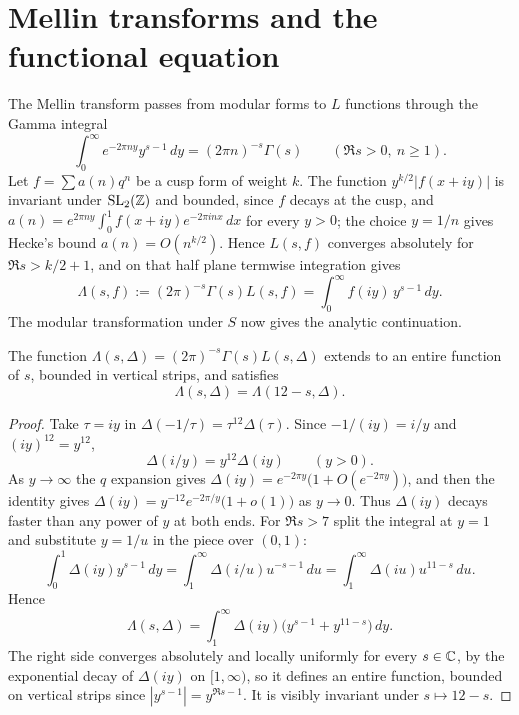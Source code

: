 \section{Mellin transforms and the functional equation}\label{sec:02mellin}

The Mellin transform passes from modular forms to $L$ functions through the Gamma integral
\[
\int_0^\infty e^{-2\pi ny}y^{s-1}\,dy=(2\pi n)^{-s}\Gamma(s)\qquad(\Re s>0,\ n\ge1).
\]
Let $f=\sum a(n)q^n$ be a cusp form of weight $k$. The function $y^{k/2}|f(x+iy)|$ is invariant under $\mathrm{SL}_2(\mathbb{Z})$ and bounded, since $f$ decays at the cusp, and $a(n)=e^{2\pi ny}\int_0^1f(x+iy)e^{-2\pi inx}\,dx$ for every $y>0$; the choice $y=1/n$ gives Hecke's bound $a(n)=O(n^{k/2})$. Hence $L(s,f)$ converges absolutely for $\Re s>k/2+1$, and on that half plane termwise integration gives
\[
\Lambda(s,f):=(2\pi)^{-s}\Gamma(s)L(s,f)=\int_0^\infty f(iy)\,y^{s-1}\,dy.
\]
The modular transformation under $S$ now gives the analytic continuation.

\begin{theorem}\label{thm:02fe}
The function $\Lambda(s,\Delta)=(2\pi)^{-s}\Gamma(s)L(s,\Delta)$ extends to an entire function of $s$, bounded in vertical strips, and satisfies
\[
\Lambda(s,\Delta)=\Lambda(12-s,\Delta).
\]
\end{theorem}

\begin{proof}
Take $\tau=iy$ in $\Delta(-1/\tau)=\tau^{12}\Delta(\tau)$. Since $-1/(iy)=i/y$ and $(iy)^{12}=y^{12}$,
\[
\Delta(i/y)=y^{12}\Delta(iy)\qquad(y>0).
\]
As $y\to\infty$ the $q$ expansion gives $\Delta(iy)=e^{-2\pi y}\bigl(1+O(e^{-2\pi y})\bigr)$, and then the identity gives $\Delta(iy)=y^{-12}e^{-2\pi/y}\bigl(1+o(1)\bigr)$ as $y\to0$. Thus $\Delta(iy)$ decays faster than any power of $y$ at both ends. For $\Re s>7$ split the integral at $y=1$ and substitute $y=1/u$ in the piece over $(0,1)$:
\[
\int_0^1\Delta(iy)y^{s-1}\,dy=\int_1^\infty\Delta(i/u)u^{-s-1}\,du=\int_1^\infty\Delta(iu)u^{11-s}\,du.
\]
Hence
\[
\Lambda(s,\Delta)=\int_1^\infty\Delta(iy)\bigl(y^{s-1}+y^{11-s}\bigr)\,dy.
\]
The right side converges absolutely and locally uniformly for every $s\in\mathbb{C}$, by the exponential decay of $\Delta(iy)$ on $[1,\infty)$, so it defines an entire function, bounded on vertical strips since $|y^{s-1}|=y^{\Re s-1}$. It is visibly invariant under $s\mapsto12-s$.
\end{proof}

